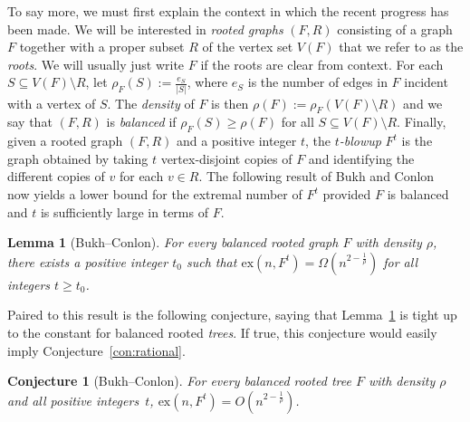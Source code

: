 \documentclass[11pt]{article}
\numberwithin{equation}{section}
\newtheorem{lemma}[theorem]{\bf Lemma}
\newtheorem{conjecture}[theorem]{\bf Conjecture}
\theoremstyle{definition}
\def\ex{\mathrm{ex}}
\begin{document}
To say more, we must first explain the context in which the recent progress has been made. We will be interested in {\it rooted graphs} $(F, R)$ consisting of a graph $F$ together with a proper subset $R$ of the vertex set $V(F)$ that we refer to as the {\it roots}. We will usually just write $F$ if the roots are clear from context. For each $S \subseteq V(F) \setminus R$, let $\rho_F(S) := \frac{e_S}{|S|}$, where $e_S$ is the number of edges in $F$ incident with a vertex of $S$. 
The \emph{density} of $F$ is then $\rho(F) := \rho_F(V(F) \setminus R)$ and we say that $(F, R)$ is {\it balanced} if $\rho_F(S) \geq \rho(F)$ for all $S \subseteq V(F) \setminus R$. Finally, given a rooted graph $(F, R)$ and a positive integer $t$, the {\it $t$-blowup} $F^t$ is the graph obtained by taking $t$ vertex-disjoint copies of $F$ and identifying the different copies of $v$ for each $v \in R$. The following result of Bukh and Conlon~\cite{BC18} now yields a lower bound for the extremal number of $F^t$ provided $F$ is balanced and $t$ is sufficiently large in terms of $F$.

\begin{lemma}[Bukh--Conlon] \label{lem:BC}
For every balanced rooted graph $F$ with density $\rho$, there exists a positive integer $t_0$ such that $\ex(n, F^t)=\Omega(n^{2-\frac{1}{\rho}})$ for all integers $t \geq t_0$.
\end{lemma}

Paired to this result is the following conjecture, saying that Lemma~\ref{lem:BC} is tight up to the constant for balanced rooted {\it trees}. If true, this conjecture would easily imply Conjecture~\ref{con:rational}. 

\begin{conjecture}[Bukh--Conlon] \label{con:BC}
For every balanced rooted tree $F$ with density $\rho$ and all positive integers~$t$, $\ex(n, F^t) = O(n^{2-\frac{1}{\rho}})$.
\end{conjecture}
\end{document}
